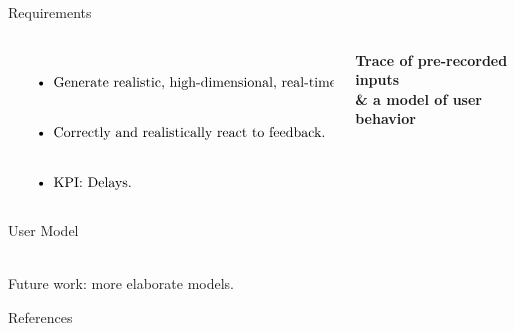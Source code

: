 \documentclass[aspectratio=1610]{beamer}
\begin{document}
\normalpage
\begin{frame}{Requirements}
    \begin{columns}[onlytextwidth]
        \begin{column}{.5\linewidth}
            $\left.
                \begin{tabular}{p{.8\linewidth}}
                    \begin{itemize}
                        \itemsep2em
                        \item Generate realistic, high-dimensional, real-time inputs.
                        \item Correctly and realistically react to feedback.
                        \item KPI: Delays.
                    \end{itemize}
                \end{tabular}%
                \right\}$
        \end{column}%
        \begin{column}{.5\linewidth}
            \centering%
            \Large\bfseries%
            Trace of pre-recorded inputs\\
            \& a model of user behavior\\
        \end{column}
    \end{columns}
\end{frame}

\begin{frame}{User Model}
    \begin{center}
        \\
        \vspace{.1\textheight}%
        Future work: more elaborate models.
    \end{center}
\end{frame}

\begin{frame}[allowframebreaks, t]{References}
    \nocite{*}
    \printbibliography%
\end{frame}
\end{document}
